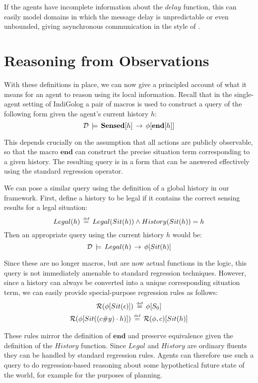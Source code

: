 If the agents have incomplete information about the $delay$ function,
this can easily model domains in which the message delay is unpredictable
or even unbounded, giving asynchronous communication in the style
of \citep{halpern90knowledge_distrib}.


\section{Reasoning from Observations\label{sec:Observations:Reasoning}}

With these definitions in place, we can now give a principled account
of what it means for an agent to reason using its local information.
Recall that in the single-agent setting of IndiGolog \citep{giacomo99indigolog}
a pair of macros is used to construct a query of the following form
given the agent's current history $h$:\[
\mathcal{D}\,\models\,\mathbf{Sensed}[h]\,\rightarrow\,\phi[\mathbf{end}[h]]\]


This depends crucially on the assumption that all actions are publicly
observable, so that the macro $\mathbf{end}$ can construct the precise
situation term corresponding to a given history. The resulting query
is in a form that can be answered effectively using the standard regression
operator.

We can pose a similar query using the definition of a global history
in our framework. First, define a history to be legal if it contains
the correct sensing results for a legal situation:\[
Legal(h)\,\stackrel{\mbox{\tiny def}}{=}\, Legal(Sit(h))\wedge History(Sit(h))=h\]
 Then an appropriate query using the current history $h$ would be:\[
\mathcal{D}\,\models\, Legal(h)\,\rightarrow\,\phi[Sit(h)]\]


Since these are no longer macros, but are now actual functions in
the logic, this query is not immediately amenable to standard regression
techniques. However, since a history can always be converted into
a unique corresponding situation term, we can easily provide special-purpose
regression rules as follows: \begin{gather*}
\mathcal{R}(\phi[Sit(\epsilon)])\,\stackrel{\mbox{\tiny def}}{=}\,\phi[S_{0}]\\
\mathcal{R}(\phi[Sit((c\#y)\cdot h)])\,\stackrel{\mbox{\tiny def}}{=}\,\mathcal{R}(\phi,c)[Sit(h)]\end{gather*}


These rules mirror the definition of $\mathbf{end}$ and preserve
equivalence given the definition of the $History$ function. Since
$Legal$ and $History$ are ordinary fluents they can be handled by
standard regression rules. Agents can therefore use such a query to
do regression-based reasoning about some hypothetical future state
of the world, for example for the purposes of planning.

